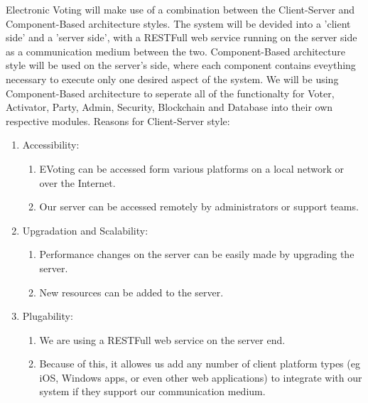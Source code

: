 Electronic Voting will make use of a combination between the Client-Server and Component-Based architecture styles. The system will be devided into a 'client side' and a 'server side', with a RESTFull web service running on the server side as a communication medium between the two. Component-Based architecture style will be used on the server's side, where each component contains eveything necessary to execute only one desired aspect of the system.
We will be using Component-Based architecture to seperate all of the functionalty for Voter, Activator, Party, Admin, Security, Blockchain and Database into their own respective modules. Reasons for Client-Server style:
	\begin{enumerate}
		\item Accessibility:
		\begin{enumerate}
			\item EVoting can be accessed form various platforms on a local network or over the Internet.
			\item Our server can be accessed remotely by administrators or support teams.
		\end{enumerate}
		\item Upgradation and Scalability:
		\begin{enumerate}
			\item Performance changes on the server can be easily made by upgrading the server.
			\item New resources can be added to the server.
		\end{enumerate}
		\item Plugability:
		\begin{enumerate}
			\item We are using a RESTFull web service on the server end.
			\item Because of this, it allowes us add any number of client platform types (eg iOS, Windows apps, or even other web applications) to integrate with our system if they support our communication medium.
		\end{enumerate}
	\end{enumerate}
	
